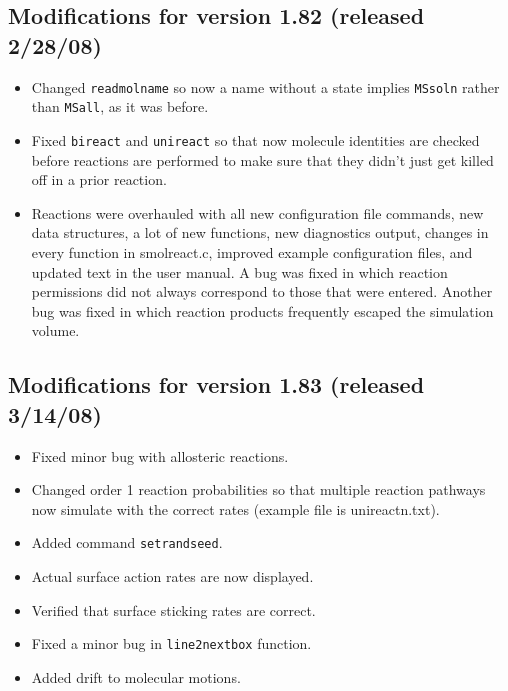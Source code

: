 \documentclass {scrbook}
\newcommand {\ttt} {\texttt}
\begin{document}
\subsection{Modifications for version 1.82 (released 2/28/08)}
\begin{itemize}
\item Changed \ttt{readmolname} so now a name without a state implies \ttt{MSsoln} rather than \ttt{MSall}, as it was before.
\item Fixed \ttt{bireact} and \ttt{unireact} so that now molecule identities are checked before reactions are performed to make sure that they didn't just get killed off in a prior reaction.
\item Reactions were overhauled with all new configuration file commands, new data structures, a lot of new functions, new diagnostics output, changes in every function in smolreact.c, improved example configuration files, and updated text in the user manual. A bug was fixed in which reaction permissions did not always correspond to those that were entered. Another bug was fixed in which reaction products frequently escaped the simulation volume.
\end{itemize}

\subsection{Modifications for version 1.83 (released 3/14/08)}
\begin{itemize}
\item Fixed minor bug with allosteric reactions.
\item Changed order 1 reaction probabilities so that multiple reaction pathways now simulate with the correct rates (example file is unireactn.txt).
\item Added command \ttt{setrandseed}.
\item Actual surface action rates are now displayed.
\item Verified that surface sticking rates are correct.
\item Fixed a minor bug in \ttt{line2nextbox} function.
\item Added drift to molecular motions.
\end{itemize}
\end{document}
